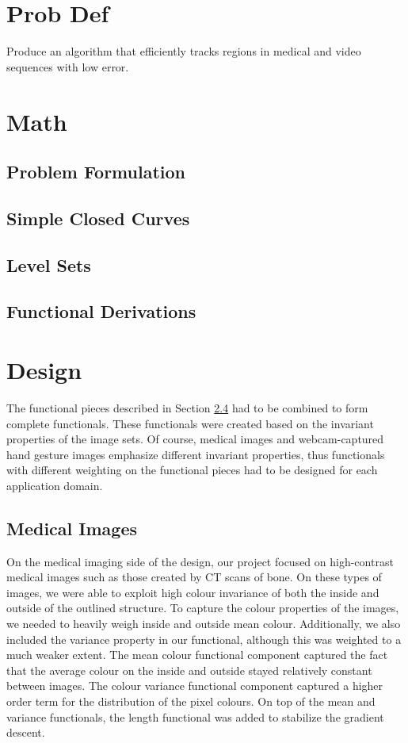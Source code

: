 \documentclass{article}
\begin{document}
	\section{Prob Def}
		Produce an algorithm that efficiently tracks regions in medical and video sequences with low error.

	\section{Math}
		\subsection{Problem Formulation}

		\subsection{Simple Closed Curves}

		\subsection{Level Sets}

		\subsection{Functional Derivations} \label{sec:funcderiv}

	\section{Design}
	The functional pieces described in Section \ref{sec:funcderiv} had to be combined to form complete functionals. These functionals were created based on the invariant properties of the image sets. Of course, medical images and webcam-captured hand gesture images emphasize different invariant properties, thus functionals with different weighting on the functional pieces had to be designed for each application domain.

		\subsection{Medical Images}
		On the medical imaging side of the design, our project focused on high-contrast medical images such as those created by CT scans of bone. On these types of images, we were able to exploit high colour invariance of both the inside and outside of the outlined structure. To capture the colour properties of the images, we needed to heavily weigh inside and outside mean colour. Additionally, we also included the variance property in our functional, although this was weighted to a much weaker extent. The mean colour functional component captured the fact that the average colour on the inside and outside stayed relatively constant between images. The colour variance functional component captured a higher order term for the distribution of the pixel colours. On top of the mean and variance functionals, the length functional was added to stabilize the gradient descent.
\end{document}
